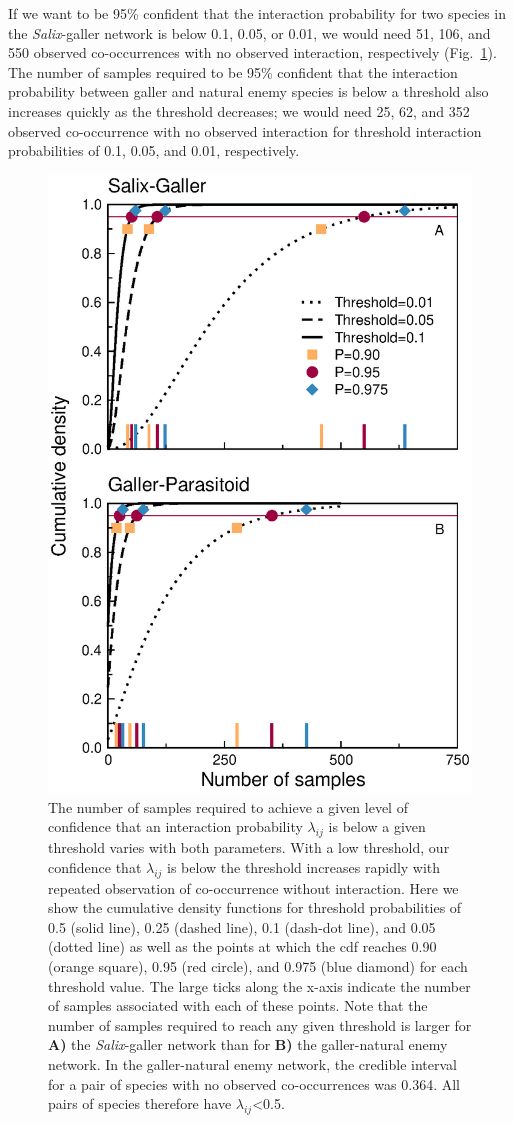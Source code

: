 \documentclass[12pt]{article}
\begin{document}
      If we want to be 95\% confident that the interaction probability for two species in the \emph{Salix}-galler network is below 0.1, 0.05, or 0.01, we would need 51, 106, and 550 observed co-occurrences with no observed interaction, respectively (Fig.~\ref{Salix_cdfs}). The number of samples required to be 95\% confident that the interaction probability between galler and natural enemy species is below a threshold also increases quickly as the threshold decreases; we would need 25, 62, and 352 observed co-occurrence with no observed interaction for threshold interaction probabilities of 0.1, 0.05, and 0.01, respectively. 


      \begin{figure}[h!]
        \caption{The number of samples required to achieve a given level of confidence that an interaction probability $\lambda_{ij}$ is below a given threshold varies with both parameters. With a low threshold, our confidence that $\lambda_{ij}$ is below the threshold increases rapidly with repeated observation of co-occurrence without interaction. Here we show the cumulative density functions for threshold probabilities of 0.5 (solid line), 0.25 (dashed line), 0.1 (dash-dot line), and 0.05 (dotted line) as well as the points at which the cdf reaches 0.90 (orange square), 0.95 (red circle), and 0.975 (blue diamond) for each threshold value. The large ticks along the x-axis indicate the number of samples associated with each of these points. Note that the number of samples required to reach any given threshold is larger for \textbf{A)} the \emph{Salix}-galler network than for \textbf{B)} the galler-natural enemy network. In the galler-natural enemy network, the credible interval for a pair of species with no observed co-occurrences was 0.364. All pairs of species therefore have $\lambda_{ij}$\textless0.5.}
        \label{Salix_cdfs}
        \begin{center}
        \includegraphics[width=.65\textwidth]{figures/Salix_Galler_samples_and_cdfs.eps}
        \end{center}
        \end{figure}
\end{document}
